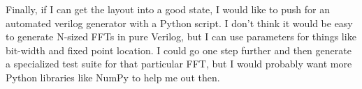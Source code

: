 \documentclass[12pt]{article}
\begin{document}
Finally, if I can get the layout into a good state, I would like to push for an
automated verilog generator with a Python script. I don't think it would be
easy to generate N-sized FFTs in pure Verilog, but I can use parameters for 
things like bit-width and fixed point location. I could go one step further
and then generate a specialized test suite for that particular FFT, but I would
probably want more Python libraries like NumPy to help me out then.


\newpage
\printbibliography
\end{document}
